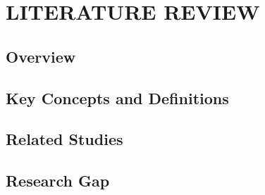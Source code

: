 
\chapter{LITERATURE REVIEW}\label{chap:literature_review}


\section{Overview}\label{sec:lit_overview}

\section{Key Concepts and Definitions}\label{sec:definitions}

\section{Related Studies}\label{sec:related_studies}

\section{Research Gap}\label{sec:research_gap}
